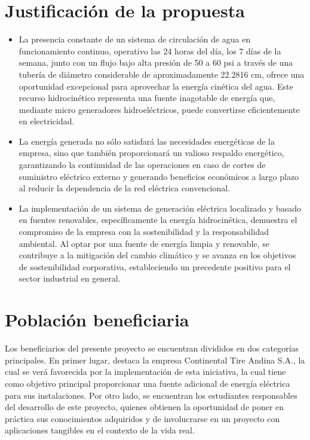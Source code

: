 \documentclass[11pt]{article}
\begin{document}
    \section{Justificación de la propuesta}
        \begin{itemize}
            \item La presencia constante de un sistema de circulación de agua en funcionamiento
            continuo, operativo las 24 horas del día, los 7 días de la semana, junto con un flujo
            bajo alta presión de 50 a 60 psi a través de una tubería de diámetro considerable de
            aproximadamente 22.2816 cm, ofrece una oportunidad excepcional para aprovechar
            la energía cinética del agua. Este recurso hidrocinético representa una fuente
            inagotable de energía que, mediante micro generadores hidroeléctricos, puede
            convertirse eficientemente en electricidad.

            \item La energía generada no sólo satisfará las necesidades energéticas de la empresa,
            sino que también proporcionará un valioso respaldo energético, garantizando la
            continuidad de las operaciones en caso de cortes de suministro eléctrico externo y
            generando beneficios económicos a largo plazo al reducir la dependencia de la red
            eléctrica convencional.

            \item La implementación de un sistema de generación eléctrica localizado y basado en
            fuentes renovables, específicamente la energía hidrocinética, demuestra el
            compromiso de la empresa con la sostenibilidad y la responsabilidad ambiental. Al
            optar por una fuente de energía limpia y renovable, se contribuye a la mitigación del
            cambio climático y se avanza en los objetivos de sostenibilidad corporativa,
            estableciendo un precedente positivo para el sector industrial en general.

        \end{itemize}    
   
    \section{Población beneficiaria}
    Los beneficiarios del presente proyecto se encuentran divididos en dos categorías
    principales. En primer lugar, destaca la empresa Continental Tire Andina S.A., la cual se
    verá favorecida por la implementación de esta iniciativa, la cual tiene como objetivo principal
    proporcionar una fuente adicional de energía eléctrica para sus instalaciones. Por otro lado,
    se encuentran los estudiantes responsables del desarrollo de este proyecto, quienes
    obtienen la oportunidad de poner en práctica sus conocimientos adquiridos y de
    involucrarse en un proyecto con aplicaciones tangibles en el contexto de la vida real.
        
\end{document}
